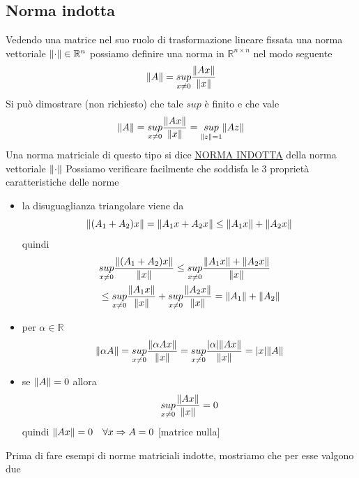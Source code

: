 \subsection{Norma indotta}
Vedendo una matrice nel suo ruolo di trasformazione lineare fissata una norma vettoriale $\lVert\cdot\rVert
\in \mathbb{R}^n$ possiamo definire una norma in $\mathbb{R}^{n\times n}$ nel modo seguente 
\begin{equation*}
    \lVert A\rVert=\underset{x\neq0}{sup}\frac{\lVert Ax\rVert}{\lVert x\rVert}
\end{equation*}
Si può dimostrare (non richiesto) che tale $sup$ è finito e che vale
\begin{equation*}
    \lVert A\rVert=\underset{x\neq0}{sup}\frac{\lVert Ax\rVert}{\lVert x\rVert}=\underset{\lVert z\rVert=1}{sup}\lVert Az\rVert
\end{equation*}
Una norma matriciale di questo tipo si dice \uline{NORMA INDOTTA} della norma vettoriale $\lVert\cdot\rVert$
Possiamo verificare facilmente che soddisfa le 3 proprietà
caratteristiche delle norme
\begin{itemize}
    \item la disuguaglianza triangolare viene da
    \[
    \lVert(A_1 + A_2)x\rVert = \lVert A_1x + A_2x\rVert \le \lVert A_1x\rVert + \lVert A_2x\rVert
    \]
    quindi
    \[
    \begin{split}
        & \underset{x \neq 0}{sup} \frac{\lVert(A_1 + A_2)x\rVert}{\lVert x\rVert} \le \underset{x \neq 0}{sup} \frac{\lVert A_1x\rVert + \lVert A_2x\rVert}{\lVert x\rVert} \\
        & \le \underset{x \neq 0}{sup} \frac{\lVert A_1x\rVert}{\lVert x\rVert} + \underset{x \neq 0}{sup} \frac{\lVert A_2x\rVert}{\lVert x\rVert} = \lVert A_1\rVert + \lVert A_2\rVert
    \end{split}
    \]
    
    \item per $\alpha \in \mathbb{R}$
    \[
    \lVert\alpha A\rVert = \underset{x \neq 0}{sup} \frac{\lVert\alpha Ax\rVert}{\lVert x\rVert}
    = \underset{x \neq 0}{sup} \frac{\lvert\alpha\rvert \lVert Ax\rVert}{\lVert x\rVert} = \lvert x\rvert \lVert A\rVert
    \]
    
    \item se $\lVert A\rVert = 0$ allora \[\underset{x \neq 0}{sup} \frac{\lVert Ax\rVert}{\lVert x\rVert} = 0\]
    quindi $\lVert Ax\rVert = 0 \quad \forall x \Rightarrow A = 0$ [matrice nulla]
\end{itemize}
Prima di fare esempi di norme matriciali indotte, mostriamo che per esse valgono due


